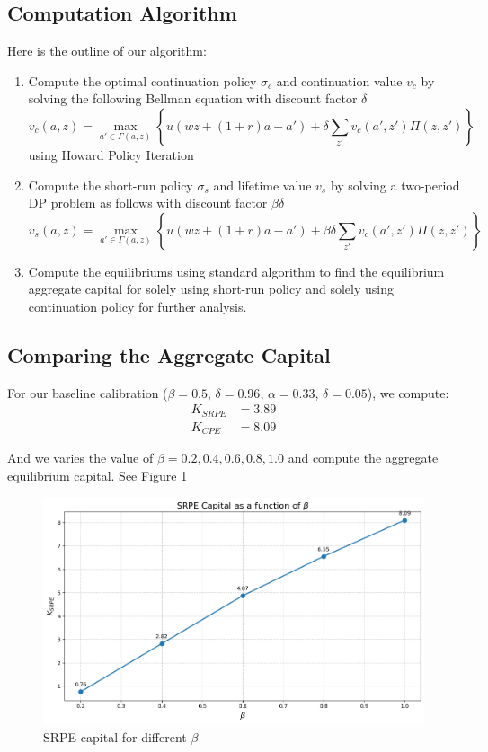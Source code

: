 \documentclass[11pt,a4paper]{article}
\begin{document}
\subsection{Computation Algorithm}
Here is the outline of our algorithm:
\begin{enumerate}
    \item Compute the optimal continuation policy $\sigma_c$ and continuation value $v_c$ by solving the following Bellman equation with discount factor $\delta$
    $$
    v_c(a,z) = \max_{a' \in \Gamma(a,z)} \left\{u(wz + (1+r)a - a') + \delta \sum_{z'} v_c(a',z')\Pi(z,z')\right\}
    $$
    using Howard Policy Iteration
    \item Compute the short-run policy $\sigma_s$ and lifetime value $v_s$ by solving a two-period DP problem as follows with discount factor $\beta\delta$
    $$
    v_s (a,z) = \max_{a'\in\Gamma(a,z)} \left\{u(wz + (1+r)a - a') + \beta\delta \sum_{z'} v_c(a',z')\Pi(z,z') \right\}
    $$
    \item Compute the equilibriums using standard algorithm to find the equilibrium aggregate capital for solely using short-run policy and solely using continuation policy for further analysis. 
\end{enumerate}

\subsection{Comparing the Aggregate Capital}
\noindent For our baseline calibration ($\beta=0.5$, $\delta=0.96$, $\alpha=0.33$, $\delta=0.05$), we compute:
\begin{align}
K_{SRPE} &= 3.89\\
K_{CPE} &= 8.09
\end{align}

\noindent And we varies the value of $\beta =  0.2, 0.4,0.6,0.8, 1.0$ and compute the aggregate equilibrium capital. See Figure \ref{fig:SRPE with different beta}
\begin{figure}[h!]
    \centering
    \includegraphics[width=1\linewidth]{QHD/image/SRPE capital.png}
    \caption{SRPE capital for different $\beta$}
    \label{fig:SRPE with different beta}
\end{figure}
\newpage 
\end{document}
